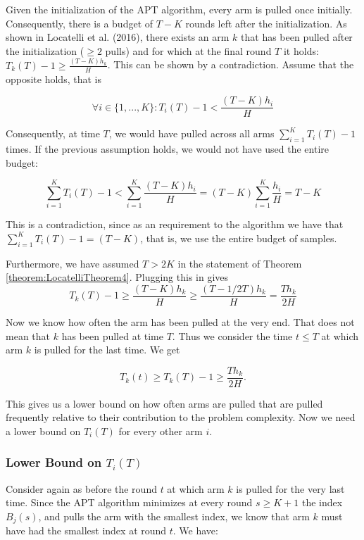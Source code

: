 \documentclass[11pt,]{article}
\begin{document}
Given the initialization of the APT algorithm, every arm is pulled once
initially. Consequently, there is a budget of \(T-K\) rounds left after
the initialization. As shown in Locatelli et al. (2016), there exists an
arm \(k\) that has been pulled after the initialization (\(\geq 2\)
pulls) and for which at the final round \(T\) it holds:
\(T_k(T) - 1 \geq \frac{(T-K)h_k}{H}\). This can be shown by a
contradiction. Assume that the opposite holds, that is

\[
\forall i \in \{1,...,K\}: T_i(T) - 1 < \frac{(T-K)h_i}{H}
\]

Consequently, at time \(T\), we would have pulled across all arms
\(\sum_{i=1}^KT_i(T)-1\) times. If the previous assumption holds, we
would not have used the entire budget:

\[
\sum_{i=1}^K T_i(T)-1 < \sum_{i=1}^K \frac{(T-K)h_i}{H} = (T-K)\sum_{i=1}^K \frac{h_i}{H} = T-K
\]

This is a contradiction, since as an requirement to the algorithm we
have that \(\sum_{i=1}^K T_i(T)-1 = (T-K)\), that is, we use the entire
budget of samples.

Furthermore, we have assumed \(T>2K\) in the statement of Theorem
\ref{theorem:LocatelliTheorem4}. Plugging this in gives \[
T_k(T) - 1 \geq \frac{(T-K)h_k}{H} \geq \frac{(T-1/2T)h_k}{H} = \frac{Th_k}{2H}
\]

Now we know how often the arm has been pulled at the very end. That does
not mean that \(k\) has been pulled at time \(T\). Thus we consider the
time \(t \leq T\) at which arm \(k\) is pulled for the last time. We get

\[
T_k(t) \geq T_k(T) - 1 \geq \frac{Th_k}{2H}.
\]

This gives us a lower bound on how often arms are pulled that are pulled
frequently relative to their contribution to the problem complexity. Now
we need a lower bound on \(T_i(T)\) for every other arm \(i\).

\subsubsection{\texorpdfstring{Lower Bound on
\(T_i(T)\)}{Lower Bound on T\_i(T)}}\label{lower-bound-on-t_it}

Consider again as before the round \(t\) at which arm \(k\) is pulled
for the very last time. Since the APT algorithm minimizes at every round
\(s \geq K+1\) the index \(B_j(s)\), and pulls the arm with the smallest
index, we know that arm \(k\) must have had the smallest index at round
\(t\). We have:
\end{document}
